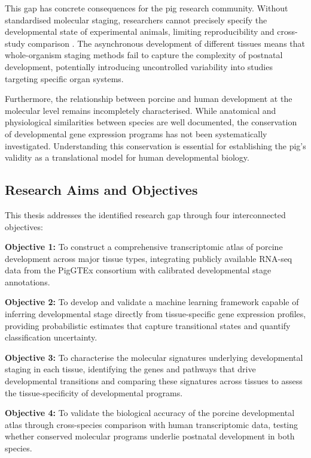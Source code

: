 This gap has concrete consequences for the pig research community. Without standardised molecular staging, researchers cannot precisely specify the developmental state of experimental animals, limiting reproducibility and cross-study comparison \parencite{baker_1500_2016}. The asynchronous development of different tissues means that whole-organism staging methods fail to capture the complexity of postnatal development, potentially introducing uncontrolled variability into studies targeting specific organ systems.

Furthermore, the relationship between porcine and human development at the molecular level remains incompletely characterised. While anatomical and physiological similarities between species are well documented, the conservation of developmental gene expression programs has not been systematically investigated. Understanding this conservation is essential for establishing the pig's validity as a translational model for human developmental biology.

\subsection{Research Aims and Objectives}

This thesis addresses the identified research gap through four interconnected objectives:

\textbf{Objective 1:} To construct a comprehensive transcriptomic atlas of porcine development across major tissue types, integrating publicly available RNA-seq data from the PigGTEx consortium with calibrated developmental stage annotations.

\textbf{Objective 2:} To develop and validate a machine learning framework capable of inferring developmental stage directly from tissue-specific gene expression profiles, providing probabilistic estimates that capture transitional states and quantify classification uncertainty.

\textbf{Objective 3:} To characterise the molecular signatures underlying developmental staging in each tissue, identifying the genes and pathways that drive developmental transitions and comparing these signatures across tissues to assess the tissue-specificity of developmental programs.

\textbf{Objective 4:} To validate the biological accuracy of the porcine developmental atlas through cross-species comparison with human transcriptomic data, testing whether conserved molecular programs underlie postnatal development in both species.

